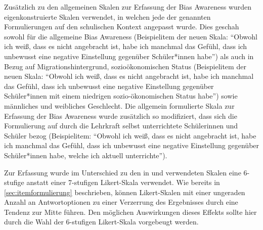 Zusätzlich zu den allgemeinen Skalen zur Erfassung der Bias Awareness wurden eigenkonstruierte Skalen verwendet, in welchen jede der genannten Formulierungen auf den schulischen Kontext angepasst wurde.
Dies geschah sowohl für die allgemeine Bias Awareness (Beispielitem der neuen Skala: ``Obwohl ich weiß, dass es nicht angebracht ist, habe ich manchmal das Gefühl, dass ich unbewusst eine negative Einstellung gegenüber Schüler*innen habe'') als auch in Bezug auf Migrationshintergrund, sozioökonomischen Status (Beispielitem der neuen Skala: ``Obwohl ich weiß, dass es nicht angebracht ist, habe ich manchmal das Gefühl, dass ich unbewusst eine negative Einstellung gegenüber Schüler*innen mit einem niedrigen sozio-ökonomischen Status habe'') sowie männliches und weibliches Geschlecht.
Die allgemein formulierte Skala zur Erfassung der Bias Awareness wurde zusätzlich so modifiziert, dass sich die Formulierung auf durch die Lehrkraft selbst unterrichtete Schülerinnen und Schüler bezog (Beispielitem: ``Obwohl ich weiß, dass es nicht angebracht ist, habe ich manchmal das Gefühl, dass ich unbewusst eine negative Einstellung gegenüber Schüler*innen habe, welche ich aktuell unterrichte'').

Zur Erfassung wurde im Unterschied zu den in \citet{perry2015modern} und \citet{bonefeld2022reflexion} verwendeten Skalen eine 6-stufige anstatt einer 7-stufigen Likert-Skala verwendet.
Wie bereits in \autoref{sec:itemformulierung} beschrieben, können Likert-Skalen mit einer ungeraden Anzahl an Antwortoptionen zu einer Verzerrung des Ergebnisses durch eine Tendenz zur Mitte führen.
Den möglichen Auswirkungen dieses Effekts sollte hier durch die Wahl der 6-stufigen Likert-Skala vorgebeugt werden.